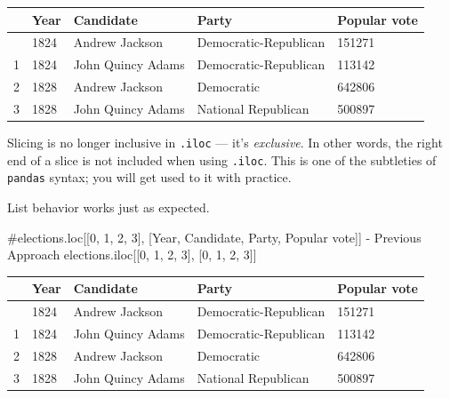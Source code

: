 \documentclass[
  letterpaper,
  DIV=11,
  numbers=noendperiod]{scrreprt}
\newenvironment{Shaded}{\begin{snugshade}}{\end{snugshade}}
\newcommand{\CommentTok}[1]{\textcolor[rgb]{0.37,0.37,0.37}{#1}}
\newcommand{\DecValTok}[1]{\textcolor[rgb]{0.68,0.00,0.00}{#1}}
\newcommand{\NormalTok}[1]{\textcolor[rgb]{0.00,0.23,0.31}{#1}}
\begin{document}
\begin{longtable}[]{@{}lllll@{}}
\toprule\noalign{}
& Year & Candidate & Party & Popular vote \\
\midrule\noalign{}
\endhead
\bottomrule\noalign{}
\endlastfoot
0 & 1824 & Andrew Jackson & Democratic-Republican & 151271 \\
1 & 1824 & John Quincy Adams & Democratic-Republican & 113142 \\
2 & 1828 & Andrew Jackson & Democratic & 642806 \\
3 & 1828 & John Quincy Adams & National Republican & 500897 \\
\end{longtable}

Slicing is no longer inclusive in \texttt{.iloc} --- it's
\emph{exclusive}. In other words, the right end of a slice is not
included when using \texttt{.iloc}. This is one of the subtleties of
\texttt{pandas} syntax; you will get used to it with practice.

List behavior works just as expected.

\begin{Shaded}
\begin{Highlighting}[]
\CommentTok{\#elections.loc[[0, 1, 2, 3], [\textquotesingle{}Year\textquotesingle{}, \textquotesingle{}Candidate\textquotesingle{}, \textquotesingle{}Party\textquotesingle{}, \textquotesingle{}Popular vote\textquotesingle{}]] {-} Previous Approach}
\NormalTok{elections.iloc[[}\DecValTok{0}\NormalTok{, }\DecValTok{1}\NormalTok{, }\DecValTok{2}\NormalTok{, }\DecValTok{3}\NormalTok{], [}\DecValTok{0}\NormalTok{, }\DecValTok{1}\NormalTok{, }\DecValTok{2}\NormalTok{, }\DecValTok{3}\NormalTok{]]}
\end{Highlighting}
\end{Shaded}

\begin{longtable}[]{@{}lllll@{}}
\toprule\noalign{}
& Year & Candidate & Party & Popular vote \\
\midrule\noalign{}
\endhead
\bottomrule\noalign{}
\endlastfoot
0 & 1824 & Andrew Jackson & Democratic-Republican & 151271 \\
1 & 1824 & John Quincy Adams & Democratic-Republican & 113142 \\
2 & 1828 & Andrew Jackson & Democratic & 642806 \\
3 & 1828 & John Quincy Adams & National Republican & 500897 \\
\end{longtable}
\end{document}
